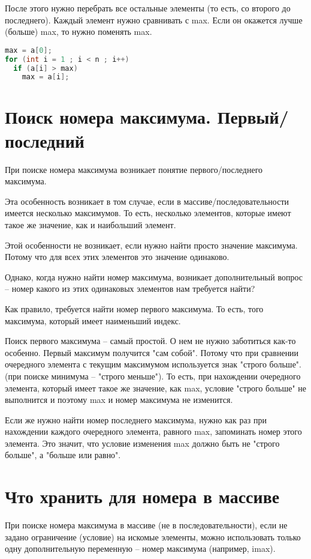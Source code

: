 \documentclass[a4paper]{article}
\begin{document}
После этого нужно перебрать все остальные элементы (то есть, со второго до последнего).
Каждый элемент нужно сравнивать с max.
Если он окажется лучше (больше) max, то нужно поменять max.
\begin{lstlisting}[language=Java] 
max = a[0];
for (int i = 1 ; i < n ; i++)
  if (a[i] > max)
    max = a[i];
\end{lstlisting} 
\section{Поиск номера максимума. Первый/последний}
При поиске номера максимума возникает понятие первого/последнего максимума.

Эта особенность возникает в том случае, если в массиве/последовательности имеется несколько максимумов.
То есть, несколько элементов, которые имеют такое же значение, как и наибольший элемент.

Этой особенности не возникает, если нужно найти просто значение максимума.
Потому что для всех этих элементов это значение одинаково.

Однако, когда нужно найти номер максимума, возникает дополнительный вопрос -- номер какого из этих одинаковых элементов нам требуется найти?

Как правило, требуется найти номер первого максимума.
То есть, того максимума, который имеет наименьший индекс.

Поиск первого максимума -- самый простой.
О нем не нужно заботиться как-то особенно.
Первый максимум получится "сам собой".
Потому что при сравнении очередного элемента с текущим максимумом используется знак "строго больше".
(при поиске минимума -- "строго меньше").
То есть, при нахождении очередного элемента, который имеет такое же значение, как max, условие "строго больше" не выполнится и поэтому max и номер максимума не изменится.

Если же нужно найти номер последнего максимума, нужно как раз при нахождении каждого очередного элемента, равного max, запоминать номер этого элемента.
Это значит, что условие изменения max должно быть не "строго больше", а "больше или равно".
\section{Что хранить для номера в массиве}
При поиске номера максимума в массиве (не в последовательности), если не задано ограничение (условие) на искомые элементы, можно использовать только одну дополнительную переменную -- номер максимума (например, imax).
\end{document}
